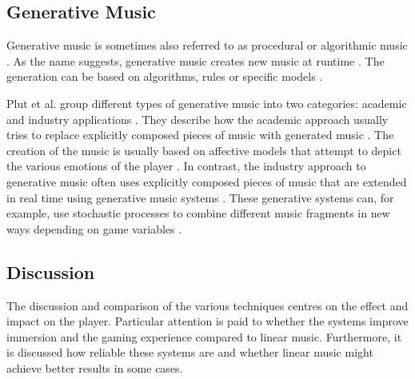 \subsection{Generative Music}
Generative music is sometimes also referred to as procedural or algorithmic music \cite{plut2020generative}. As the name suggests, generative music creates new music at runtime \cite{amaral2022adaptive}. The generation can be based on algorithms, rules or specific models \cite{plut2020generative} \cite{amaral2022adaptive}. 

Plut et al. group different types of generative music into two categories: academic and industry applications \cite{plut2022preglam}. They describe how the academic approach usually tries to replace explicitly composed pieces of music with generated music \cite{plut2022preglam}. The creation of the music is usually based on affective models that attempt to depict the various emotions of the player \cite{plut2022preglam}. In contrast, the industry approach to generative music often uses explicitly composed pieces of music that are extended in real time using generative music systems \cite{plut2022preglam}. These generative systems can, for example, use stochastic processes to combine different music fragments in new ways depending on game variables \cite{plut2022preglam}.

\subsection{Discussion}
The discussion and comparison of the various techniques centres on the effect and impact on the player. Particular attention is paid to whether the systems improve immersion and the gaming experience compared to linear music. Furthermore, it is discussed how reliable these systems are and whether linear music might achieve better results in some cases.
